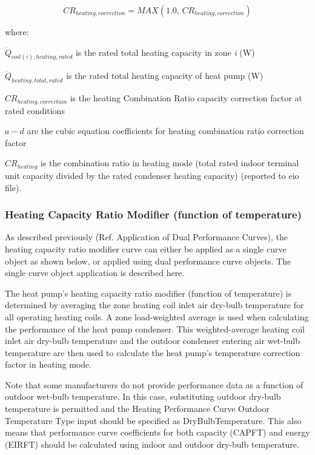\begin{equation}
  CR_{heating,correction} = MAX \left( 1.0,\,CR_{heating,correction} \right)
\end{equation}

where:

\(\dot{Q}_{coil(i),heating,rated}\) is the rated total heating capacity in zone \emph{i} (W)

\(\dot{Q}_{heating,total,rated}\) is the rated total heating capacity of heat pump (W)

\(CR_{heating,correction}\) is the heating Combination Ratio capacity correction factor at rated conditions

\(a - d\) are the cubic equation coefficients for heating combination ratio correction factor

\(CR_{heating}\) is the combination ratio in heating mode (total rated indoor terminal unit capacity divided by the rated condenser heating capacity) (reported to eio file).

\subsubsection{Heating Capacity Ratio Modifier (function of temperature)}\label{heating-capacity-ratio-modifier-function-of-temperature}

As described previously (Ref. Application of Dual Performance Curves), the heating capacity ratio modifier curve can either be applied as a single curve object as shown below, or applied using dual performance curve objects. The single curve object application is described here.

The heat pump's heating capacity ratio modifier (function of temperature) is determined by averaging the zone heating coil inlet air dry-bulb temperature for all operating heating coils. A zone load-weighted average is used when calculating the performance of the heat pump condenser. This weighted-average heating coil inlet air dry-bulb temperature and the outdoor condenser entering air wet-bulb temperature are then used to calculate the heat pump's temperature correction factor in heating mode.

Note that some manufacturers do not provide performance data as a function of outdoor wet-bulb temperature. In this case, substituting outdoor dry-bulb temperature is permitted and the Heating Performance Curve Outdoor Temperature Type input should be specified as DryBulbTemperature. This also means that performance curve coefficients for both capacity (CAPFT) and energy (EIRFT) should be calculated using indoor and outdoor dry-bulb temperature.

